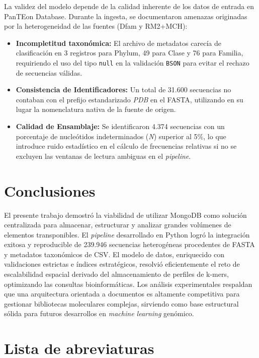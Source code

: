 \documentclass[pdflatex,lineno,referee,sn-vancouver-num]{sn-jnl}
\theoremstyle{thmstyleone}%
\theoremstyle{thmstyletwo}%
\theoremstyle{thmstylethree}%
\begin{document}
La validez del modelo depende de la calidad inherente de los datos de entrada en PanTEon Database. Durante la ingesta, se documentaron amenazas originadas por la heterogeneidad de las fuentes (Dfam y RM2+MCH):
\begin{itemize}
    \item \textbf{Incompletitud taxonómica:} El archivo de metadatos carecía de clasificación en 3 registros para Phylum, 49 para Clase y 76 para Familia, requiriendo el uso del tipo \texttt{null} en la validación \texttt{BSON} para evitar el rechazo de secuencias válidas.
    \item \textbf{Consistencia de Identificadores:} Un total de 31.600 secuencias no contaban con el prefijo estandarizado \textit{PDB} en el FASTA, utilizando en su lugar la nomenclatura nativa de la fuente de origen.
    \item \textbf{Calidad de Ensamblaje:} Se identificaron 4.374 secuencias con un porcentaje de nucleótidos indeterminados (\textit{N}) superior al 5\%, lo que introduce ruido estadístico en el cálculo de frecuencias relativas si no se excluyen las ventanas de lectura ambiguas en el \textit{pipeline}.
\end{itemize}

\section{Conclusiones}\label{sec:conclusiones}

El presente trabajo demostró la viabilidad de utilizar MongoDB como solución centralizada para almacenar, estructurar y analizar grandes volúmenes de elementos transponibles. El \textit{pipeline} desarrollado en Python logró la integración exitosa y reproducible de 239.946 secuencias heterogéneas procedentes de FASTA y metadatos taxonómicos de CSV. El modelo de datos, enriquecido con validaciones estrictas e índices estratégicos, resolvió eficientemente el reto de escalabilidad espacial derivado del almacenamiento de perfiles de k-mers, optimizando las consultas bioinformáticas. Los análisis experimentales respaldan que una arquitectura orientada a documentos es altamente competitiva para gestionar bibliotecas moleculares complejas, sirviendo como base estructural sólida para futuros desarrollos en \textit{machine learning} genómico.

\backmatter

\section*{Lista de abreviaturas}
\end{document}
